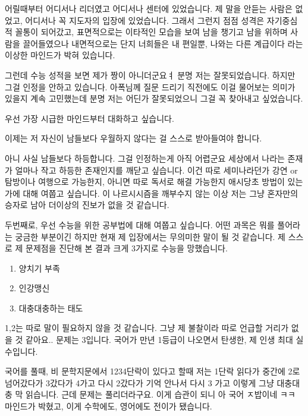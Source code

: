  

어릴때부터 어디서나 리더였고 어디서나 센터에 있었습니다.
제 말을 안듣는 사람은 없었고, 어디서나 꼭 지도자의 입장에 있었습니다.
그래서 그런지 점점 성격은 자기중심적 꼴통이 되어갔고, 
표면적으로는 이타적인 모습을 보여 남을 챙기고 남을 위하며 사람을 끌어들였으나
내면적으로는 단지 너희들은 내 편일뿐, 나와는 다른 계급이다 라는 이상한 마인드가 박혀 있습니다.
\vspace{5mm}
 

그런데 수능 성적을 보면 제가 짱이 아니더군요ㅕ
분명 저는 잘못되었습니다. 하지만 그걸 인정을 안하고 있습니다.
아폭님께 질문 드리기 직전에도 이걸 물어보는 의미가 있을지 계속 고민했는데
분명 저는 어딘가 잘못되었으니 그걸 꼭 찾아내고 싶었습니다.

\vspace{5mm}

우선 가장 시급한 마인드부터 대화하고 싶습니다.
\vspace{5mm}
 

이제는 저 자신이 남들보다 우월하지 않다는 걸 스스로 받아들여야 합니다.
\vspace{5mm}
 

아니 사실 남들보다 하등합니다. 그걸 인정하는게 아직 어렵군요
세상에서 나라는 존재가 얼마나 작고 하등한 존재인지를 깨닫고 싶습니다.
이건 따로 세미나라던가 강연 or 탐방이나 여행으로 가능한지, 아니면 따로 독서로 해결 가능한지 
애시당초 방법이 있는가에 대해 여쭙고 싶습니다.
이 나르시시즘을 깨부수지 않는 이상 저는 그냥 혼자만의 승자로 남아 더이상의 진보가 없을 것 같습니다.
\vspace{5mm}
 

두번째로, 우선 수능을 위한 공부법에 대해 여쭙고 싶습니다.
어떤 과목은 뭐를 풀어라는 궁금한 부분이긴 하지만 현재 제 입장에서는 무의미한 말이 될 것 같습니다.
제 스스로 제 문제점을 진단해 본 결과 크게 3가지로 수능을 망했습니다.

 
\begin{enumerate}
    \item 양치기 부족
    \item 인강맹신
    \item 대충대충하는 태도
\end{enumerate}

 

1,2는 따로 말이 필요하지 않을 것 같습니다. 그냥 제 불찰이라 따로 언급할 거리가 없을 것 같아요..
문제는 3입니다.
국어가 만년 1등급이 나오면서 탄생한, 제 인생 최대 실수입니다.
\vspace{5mm}
 

국어를 풀때, 비 문학지문에서 1234단락이 있다고 할때
저는 1단락 읽다가 중간에 2로 넘어갔다가 3갔다가 4가고 다시 2갔다가 기억 안나서 다시 3 가고 이렇게
그냥 대충대충 막 읽습니다.
근데 문제는 풀리더라구요.
이게 습관이 되니 아 국어 ㅈ밥이네 ㅋㅋ 마인드가 박혔고,
이게 수학에도, 영어에도 전이가 됐습니다.
\vspace{5mm}
 

